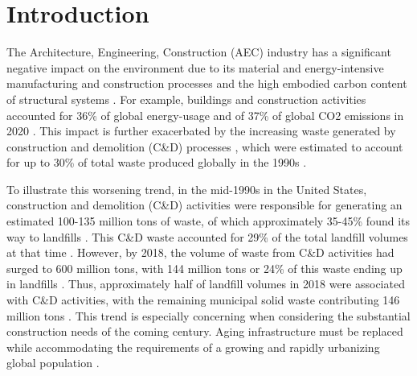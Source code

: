 \clearpage
\section{Introduction}
    The Architecture, Engineering, Construction (AEC) industry has a significant negative impact on the environment due to its material and energy-intensive manufacturing and construction processes \citep{international_energy_agency_2018_2018} and the high embodied carbon content of structural systems \citep{kaethner_embodied_2012, fang_reducing_2023}. For example, buildings and construction activities accounted for 36\% of global energy-usage and of 37\% of global CO2 emissions in 2020 \citep{united_nations_global_2021}. This impact is further exacerbated by the increasing waste generated by construction and demolition (C\&D) processes \citep{us_epa_construction_2018, us_epa_construction_2020}, which were estimated to account for up to 30\% of total waste produced globally in the 1990s \citep{purchase_circular_2022, fishbein_building_1998}.
    
    To illustrate this worsening trend, in the mid-1990s in the United States, construction and demolition (C\&D) activities were responsible for generating an estimated 100-135 million tons of waste, of which approximately 35-45\% found its way to landfills \citep{mills_cost-effective_1999, us_epa_characterization_1998}. This C\&D waste accounted for 29\% of the total landfill volumes at that time \citep{lu_framework_2011}. However, by 2018, the volume of waste from C\&D activities had surged to 600 million tons, with 144 million tons or 24\% of this waste ending up in landfills \citep{us_epa_advancing_2020}. Thus, approximately half of landfill volumes in 2018 were associated with C\&D activities, with the remaining municipal solid waste contributing 146 million tons \citep{us_epa_advancing_2020}. This trend is especially concerning when considering the substantial construction needs of the coming century. Aging infrastructure must be replaced while accommodating the requirements of a growing and rapidly urbanizing global population \citep{ritchie_urbanization_2018}.

